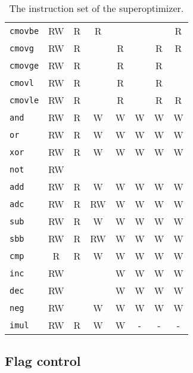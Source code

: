 \documentclass[a4paper,11pt]{kth-mag}
\begin{document}
\begin{table}
\begin{tabular}{l|cc|ccccc}
\verb|cmovbe| & RW & R  & R         &           &           &           & R         \\
\verb|cmovg|  & RW & R  &           & R         &           & R         & R         \\
\verb|cmovge| & RW & R  &           & R         &           & R         &           \\
\verb|cmovl|  & RW & R  &           & R         &           & R         &           \\
\verb|cmovle| & RW & R  &           & R         &           & R         & R         \\
\hline
\verb|and|    & RW & R  & W         & W         & W         & W         & W         \\
\verb|or|     & RW & R  & W         & W         & W         & W         & W         \\
\verb|xor|    & RW & R  & W         & W         & W         & W         & W         \\
\verb|not|    & RW &    &           &           &           &           &           \\
\hline
\verb|add|    & RW & R  & W         & W         & W         & W         & W         \\
\verb|adc|    & RW & R  & RW        & W         & W         & W         & W         \\
\verb|sub|    & RW & R  & W         & W         & W         & W         & W         \\
\verb|sbb|    & RW & R  & RW        & W         & W         & W         & W         \\
\verb|cmp|    & R  & R  & W         & W         & W         & W         & W         \\
\verb|inc|    & RW &    &           & W         & W         & W         & W         \\
\verb|dec|    & RW &    &           & W         & W         & W         & W         \\
\verb|neg|    & RW &    & W         & W         & W         & W         & W         \\
\hline
\verb|imul|   & RW & R  & W         & W         & -         & -         & -         \\
\end{tabular}
\caption{The instruction set of the superoptimizer.} %
\label{tab:insns}
\end{table}

\subsection{Flag control}
\end{document}
